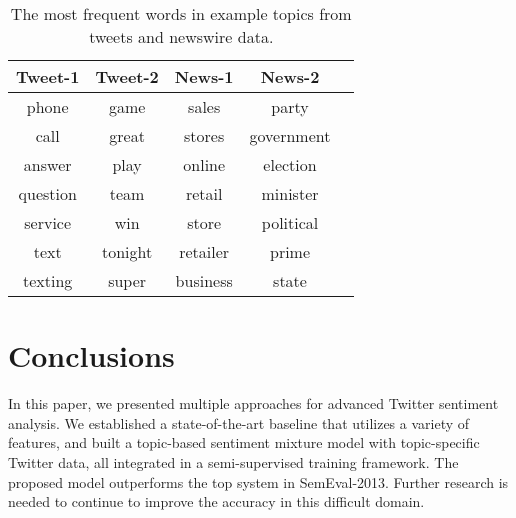 \documentclass[11pt]{article}
\begin{document}
\begin{table}[h]
\begin{center}
\begin{tabular}{|c|c|c|c|c|}
\hline
\bf Tweet-1 & \bf Tweet-2 & \bf News-1 & \bf News-2 \\ \hline\hline
phone     &  game  &  sales  &  party  \\
call      &  great &  stores &  government \\
answer    &  play  &  online &  election \\
question  &  team  &  retail &  minister \\
service   &  win   &  store  &  political \\ 
text      &  tonight & retailer &  prime \\
texting   &  super &  business &  state \\
\hline
\end{tabular}
\end{center}
\caption{\label{topics} The most frequent words in example topics from tweets and newswire data.}
\end{table}

\section{Conclusions}
In this paper, we presented multiple approaches for advanced Twitter sentiment
analysis. We established a state-of-the-art baseline that utilizes a variety of features, 
and built a topic-based sentiment mixture model with topic-specific Twitter data, all
integrated in a semi-supervised training framework. 
The proposed model outperforms the top system in SemEval-2013. 
Further research is needed to continue to improve the accuracy in this difficult domain.

%
%
\end{document}
